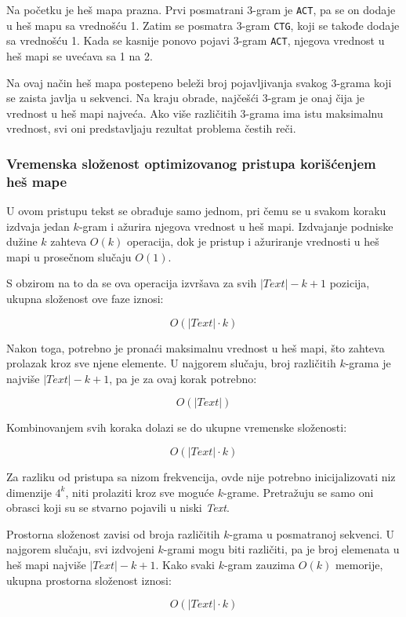 \documentclass[12pt,oneside]{memoir}
\begin{document}
Na početku je heš mapa prazna. Prvi posmatrani 3-gram je \texttt{ACT}, pa se on dodaje u heš mapu sa vrednošću 1. Zatim se posmatra 3-gram \texttt{CTG}, koji se takođe dodaje sa vrednošću 1. Kada se kasnije ponovo pojavi 3-gram \texttt{ACT}, njegova vrednost u heš mapi se uvećava sa 1 na 2.

Na ovaj način heš mapa postepeno beleži broj pojavljivanja svakog 3-grama koji se zaista javlja u sekvenci. Na kraju obrade, najčešći 3-gram je onaj čija je vrednost u heš mapi najveća. Ako više različitih 3-grama ima istu maksimalnu vrednost, svi oni predstavljaju rezultat problema čestih reči.


\subsubsection{Vremenska složenost optimizovanog pristupa korišćenjem heš mape}

U ovom pristupu tekst se obrađuje samo jednom, pri čemu se u svakom koraku izdvaja jedan $k$-gram i ažurira njegova vrednost u heš mapi. Izdvajanje podniske dužine $k$ zahteva $O(k)$ operacija, dok je pristup i ažuriranje vrednosti u heš mapi u prosečnom slučaju $O(1)$.

S obzirom na to da se ova operacija izvršava za svih $|Text| - k + 1$ pozicija, ukupna složenost ove faze iznosi:

\[
O(|Text| \cdot k)
\]

Nakon toga, potrebno je pronaći maksimalnu vrednost u heš mapi, što zahteva prolazak kroz sve njene elemente. U najgorem slučaju, broj različitih $k$-grama je najviše $|Text| - k + 1$, pa je za ovaj korak potrebno:

\[
O(|Text|)
\]

Kombinovanjem svih koraka dolazi se do ukupne vremenske složenosti:

\[
O(|Text| \cdot k)
\]

Za razliku od pristupa sa nizom frekvencija, ovde nije potrebno inicijalizovati niz dimenzije $4^k$, niti prolaziti kroz sve moguće $k$-grame. Pretražuju se samo oni obrasci koji su se stvarno pojavili u niski \textit{Text}.

Prostorna složenost zavisi od broja različitih $k$-grama u posmatranoj sekvenci. U najgorem slučaju, svi izdvojeni $k$-grami mogu biti različiti, pa je broj elemenata u heš mapi najviše $|Text| - k + 1$. Kako svaki $k$-gram zauzima $O(k)$ memorije, ukupna prostorna složenost iznosi:

\[
O(|Text| \cdot k)
\]
\end{document}
